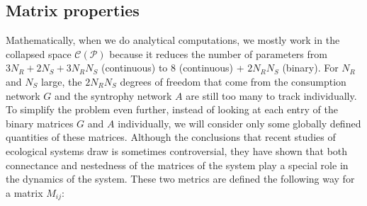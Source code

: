 \documentclass[12pt, titlepage]{report}
\begin{document}
\subsection{Matrix properties}
Mathematically, when we do analytical computations, we mostly work in the collapsed space $\mathcal{C}(\mathcal{P})$ because it reduces the number of parameters from $3N_R+2N_S+3N_RN_S$ (continuous) to $8$ (continuous) + $2N_RN_S$ (binary). For $N_R$ and $ N_S$ large, the $2N_R N_S$ degrees of freedom that come from the consumption network $G$ and the syntrophy network $A$ are still too many to track individually. To simplify the problem even further, instead of looking at each entry of the binary matrices $G$ and $A$ individually, we will consider only some globally defined quantities of these matrices. Although the conclusions that recent studies of ecological systems draw is sometimes controversial, they have shown that both connectance \cite{thebault_stability_2010, james_disentangling_2012} and nestedness \cite{bastolla_architecture_2009, rohr_structural_2014, pascual-garcia_mutualism_2017} of the matrices of the system play a special role in the dynamics of the system. These two metrics are defined the following way for a matrix $M_{ij}$:
\end{document}
